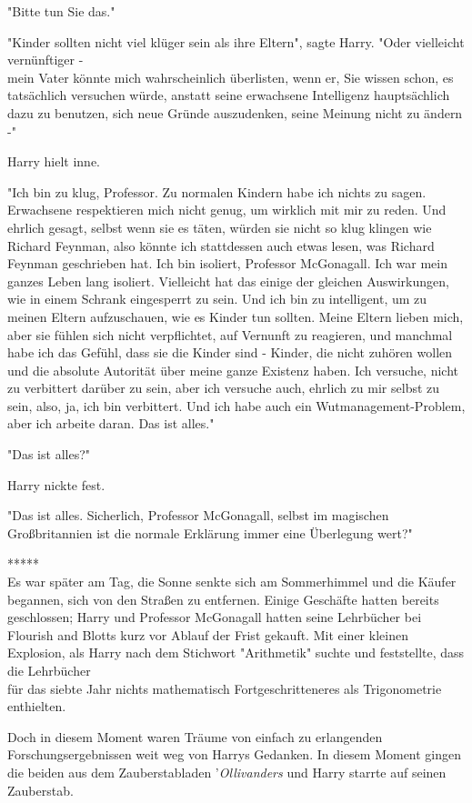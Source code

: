 {"Bitte tun Sie das."

"Kinder sollten nicht viel klüger sein als ihre Eltern", sagte Harry. "Oder vielleicht vernünftiger -\\ mein Vater könnte mich wahrscheinlich überlisten, wenn er, Sie wissen schon, es tatsächlich versuchen würde, anstatt seine erwachsene Intelligenz hauptsächlich dazu zu benutzen, sich neue Gründe auszudenken, seine Meinung nicht zu ändern -"

Harry hielt inne.

"Ich bin zu klug, Professor. Zu normalen Kindern habe ich nichts zu sagen. Erwachsene respektieren mich nicht genug, um wirklich mit mir zu reden. Und ehrlich gesagt, selbst wenn sie es täten, würden sie nicht so klug klingen wie Richard Feynman, also könnte ich stattdessen auch etwas lesen, was Richard Feynman geschrieben hat. Ich bin isoliert, Professor McGonagall. Ich war mein ganzes Leben lang isoliert. Vielleicht hat das einige der gleichen Auswirkungen, wie in einem Schrank eingesperrt zu sein. Und ich bin zu intelligent, um zu meinen Eltern aufzuschauen, wie es Kinder tun sollten. Meine Eltern lieben mich, aber sie fühlen sich nicht verpflichtet, auf Vernunft zu reagieren, und manchmal habe ich das Gefühl, dass sie die Kinder sind - Kinder, die nicht zuhören wollen und die absolute Autorität über meine ganze Existenz haben. Ich versuche, nicht zu verbittert darüber zu sein, aber ich versuche auch, ehrlich zu mir selbst zu sein, also, ja, ich bin verbittert. Und ich habe auch ein Wutmanagement-Problem, aber ich arbeite daran. Das ist alles."

"Das ist alles?"

Harry nickte fest.

"Das ist alles. Sicherlich, Professor McGonagall, selbst im magischen Großbritannien ist die normale Erklärung immer eine Überlegung wert?"

*****\\ Es war später am Tag, die Sonne senkte sich am Sommerhimmel und die Käufer begannen, sich von den Straßen zu entfernen. Einige Geschäfte hatten bereits geschlossen; Harry und Professor McGonagall hatten seine Lehrbücher bei Flourish and Blotts kurz vor Ablauf der Frist gekauft. Mit einer kleinen Explosion, als Harry nach dem Stichwort "Arithmetik" suchte und feststellte, dass die Lehrbücher\\ für das siebte Jahr nichts mathematisch Fortgeschritteneres als Trigonometrie enthielten.

Doch in diesem Moment waren Träume von einfach zu erlangenden Forschungsergebnissen weit weg von Harrys Gedanken. In diesem Moment gingen die beiden aus dem Zauberstabladen '\emph{Ollivanders} und Harry starrte auf seinen Zauberstab.

}
